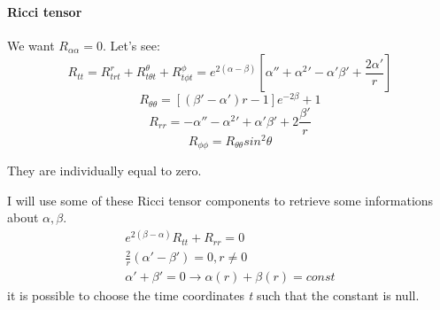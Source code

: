 \paragraph{Ricci tensor}
We want $R_{\alpha \alpha } = 0$. Let's see:
\begin{equation}
	R_{tt} = R^{r}_{trt} + R^{\theta }_{t\theta t} + R^{\phi }_{t\phi t} = e^{2\left( \alpha -\beta  \right)}\left[ \alpha '' + \alpha ^{2}' - \alpha '\beta ' +\frac{2\alpha '}{r}\right] 
\end{equation}
\begin{equation}
	R_{\theta \theta } = \left[ \left( \beta ' - \alpha '  \right)r-1\right] e^{-2\beta }+1
\end{equation}
\begin{equation}
R_{rr} = -\alpha '' - \alpha ^{2}' + \alpha ' \beta ' + 2 \frac{\beta '}{r}
\end{equation}
\begin{equation}
	R_{\phi \phi } = R_{\theta \theta }sin^{2}\theta 
\end{equation}

They are individually equal to zero.

I will use some of these Ricci tensor components to retrieve some informations about $\alpha, \beta $.
\begin{gather*}
e^{2\left( \beta -\alpha  \right)}R_{tt} + R_{rr} = 0 \\
\frac{2}{r}\left( \alpha '-\beta ' \right) = 0 , r\neq 0 \\
\alpha '+ \beta ' = 0 \to  \alpha \left( r \right)+\beta \left( r \right) = const
\end{gather*}
it is possible to choose the time coordinates \emph{t} such that the constant is null.























